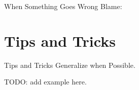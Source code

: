 \documentclass[main.tex]{subfile}
\begin{document}
\begin{frame}{When Something Goes Wrong Blame:}

	\begin{itemize}
	\end{itemize}

\end{frame}


\section{Tips and Tricks} 
\label{sec:tips_and_tricks}

\begin{frame}{Tips and Tricks}
	Generalize when Possible.

	TODO: add example here.
\end{frame}

\end{document}
